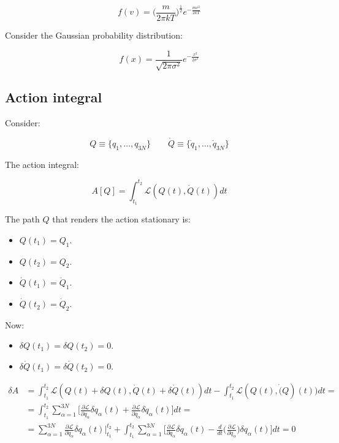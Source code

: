	$$f(v) = \biggl(\frac{m}{2\pi kT}\biggr)^\frac{1}{2}e^{-\frac{mv^2}{2kT}}$$

	Consider the Gaussian probability distribution:

	$$f(x) = \frac{1}{\sqrt{2\pi\sigma^2}}e^{-\frac{x^2}{2\sigma^2}}$$

	\subsection{Action integral}
	Consider:

	$$Q \equiv\{q_1, \dots, q_{3N}\}\qquad \dot{Q}\equiv\{\dot{q}_1, \dots, \dot{q}_{3N}\}$$

	The action integral:

	$$A[Q] = \int_{t_1}^{t_2}\mathcal{L}(Q(t), \dot{Q}(t))dt$$

	The path $Q$ that renders the action stationary is:

	\begin{multicols}{4}
		\begin{itemize}
			\item $Q(t_1) = Q_1$.
			\item $Q(t_2) = Q_2$.
			\item $\dot{Q}(t_1) = \dot{Q}_1$.
			\item $\dot{Q}(t_2) = \dot{Q}_2$.
		\end{itemize}
	\end{multicols}

	Now:

	\begin{multicols}{2}
		\begin{itemize}
			\item $\delta Q(t_1) = \delta Q(t_2) = 0$.
			\item $\delta\dot{Q}(t_1) = \delta\dot{Q}(t_2) = 0$.
		\end{itemize}
	\end{multicols}

	\begin{align*}
		\delta A &= \int_{t_1}^{t_2}\mathcal{L}(Q(t) + \delta Q(t), \dot{Q}(t)+\delta\dot{Q}(t))dt - \int_{t_1}^{t_2}\mathcal{L}(Q(t), \dot(Q)(t))dt = \\
						 &=\int_{t_1}^{t_2}\sum\limits_{\alpha=1}^{3N}\biggl[\frac{\partial\mathcal{L}}{\partial q_\alpha}\delta q_\alpha(t) + \frac{\partial\mathcal{L}}{\partial\dot{q}_\alpha}\delta\dot{q}_\alpha(t)\biggr]dt=\\
						 &=\sum\limits_{\alpha=1}^{3N}\frac{\partial\mathcal{L}}{\partial\dot{q}_\alpha}\delta q_\alpha(t)|_{t_1}^{t_2} + \int_{t_1}^{t_2}\sum\limits_{\alpha=1}^{3N}\biggl[\frac{\partial\mathcal{L}}{\partial q_\alpha}\delta q_\alpha(t) - \frac{d}{dt}\biggl(\frac{\partial\mathcal{L}}{\partial\dot{q}_\alpha}\biggr)\delta q_\alpha(t)\biggr] dt = 0
	\end{align*}

